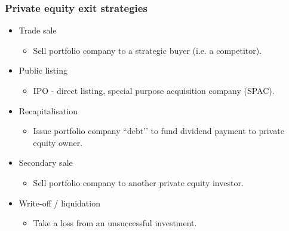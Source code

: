 \documentclass[../notes_compiled.tex]{subfiles}
\begin{document}
\subsubsection{Private equity exit strategies}
\begin{itemize}
\item Trade sale
\begin{itemize}
\item Sell portfolio company to a strategic buyer (i.e. a competitor).
\end{itemize}
\item Public listing
\begin{itemize}
\item IPO - direct listing, special purpose acquisition company (SPAC).
\end{itemize}
\item Recapitalisation
\begin{itemize}
\item Issue portfolio company ``debt’’ to fund dividend payment to private equity owner.
\end{itemize}
\item Secondary sale
\begin{itemize}
\item Sell portfolio company to another private equity investor.
\end{itemize}
\item Write-off / liquidation
\begin{itemize}
\item Take a loss from an unsuccessful investment.
\end{itemize}
\end{itemize}
\end{document}
